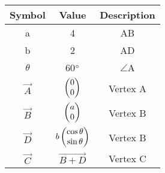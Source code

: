 \begin{tabular}{|c|c|c|}
	\hline 
\textbf{Symbol} & \textbf{Value} & \textbf{Description}\\
    \hline
    a & 4 & AB \\
    \hline
    b & 2 & AD \\
    \hline
    $\theta$ & 60$\degree$ & $\angle$A \\ 
    \hline
    $\vec{A}$ & $\begin{pmatrix}0 \\ 0\end{pmatrix}$ & Vertex A \\
    \hline
    $\vec{B}$ & $\begin{pmatrix}a \\ 0\end{pmatrix}$ & Vertex B \\
    \hline
    $\vec{D}$ & $b\begin{pmatrix}\cos\theta \\ \sin\theta\end{pmatrix}$ & Vertex B \\ 
    \hline
    $\vec{C}$ & $\vec{B+D}$ & Vertex C \\ 
    \hline
    
\end{tabular}
